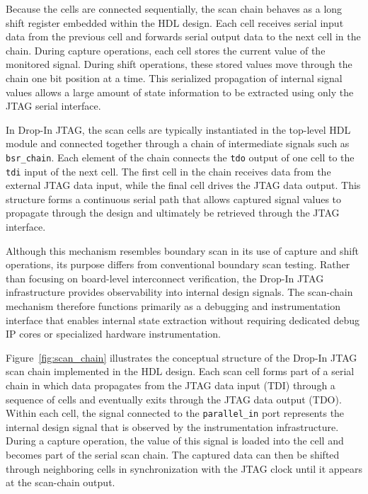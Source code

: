 \documentclass[10pt]{article}
\begin{document}
Because the cells are connected sequentially, the scan chain behaves as a long shift register embedded within the HDL design. Each cell receives serial input data from the previous cell and forwards serial output data to the next cell in the chain. During capture operations, each cell stores the current value of the monitored signal. During shift operations, these stored values move through the chain one bit position at a time. This serialized propagation of internal signal values allows a large amount of state information to be extracted using only the JTAG serial interface.

In Drop-In JTAG, the scan cells are typically instantiated in the top-level HDL module and connected together through a chain of intermediate signals such as \texttt{bsr\_chain}. Each element of the chain connects the \texttt{tdo} output of one cell to the \texttt{tdi} input of the next cell. The first cell in the chain receives data from the external JTAG data input, while the final cell drives the JTAG data output. This structure forms a continuous serial path that allows captured signal values to propagate through the design and ultimately be retrieved through the JTAG interface.

Although this mechanism resembles boundary scan in its use of capture and shift operations, its purpose differs from conventional boundary scan testing. Rather than focusing on board-level interconnect verification, the Drop-In JTAG infrastructure provides observability into internal design signals. The scan-chain mechanism therefore functions primarily as a debugging and instrumentation interface that enables internal state extraction without requiring dedicated debug IP cores or specialized hardware instrumentation.

Figure~\ref{fig:scan_chain} illustrates the conceptual structure of the Drop-In JTAG scan chain implemented in the HDL design. Each scan cell forms part of a serial chain in which data propagates from the JTAG data input (TDI) through a sequence of cells and eventually exits through the JTAG data output (TDO). Within each cell, the signal connected to the \texttt{parallel\_in} port represents the internal design signal that is observed by the instrumentation infrastructure. During a capture operation, the value of this signal is loaded into the cell and becomes part of the serial scan chain. The captured data can then be shifted through neighboring cells in synchronization with the JTAG clock until it appears at the scan-chain output.
\end{document}
